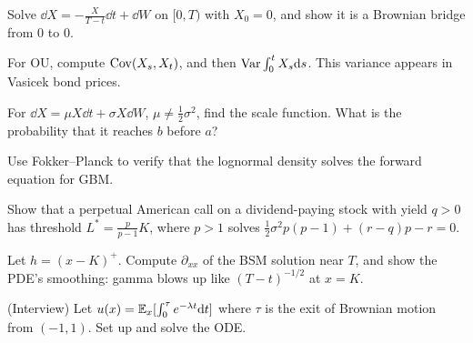 \begin{exercises}
\item Solve $\dd X=-\frac{X}{T-t}\dd t+\dd W$ on $[0,T)$ with $X_0=0$, and show it is a Brownian bridge from $0$ to $0$.
\item For OU, compute $\operatorname{Cov}(X_s,X_t)$, and then $\operatorname{Var}\int_0^tX_s\mathrm{d} s$. This variance appears in Vasicek bond prices.
\item For $\dd X=\mu X\dd t+\sigma X\dd W$, $\mu\ne\tfrac12\sigma^2$, find the scale function. What is the probability that it reaches $b$ before $a$?
\item Use Fokker--Planck to verify that the lognormal density solves the forward equation for GBM.
\item Show that a perpetual American call on a dividend-paying stock with yield $q>0$ has threshold $L^*=\frac{p}{p-1}K$, where $p>1$ solves $\tfrac12\sigma^2p(p-1)+(r-q)p-r=0$.
\item Let $h=(x-K)^+$. Compute $\partial_{xx}$ of the BSM solution near $T$, and show the PDE's smoothing: gamma blows up like $(T-t)^{-1/2}$ at $x=K$.
\item (Interview) Let $u(x)=\mathbb{E}_x[\int_0^\tau e^{-\lambda t}\mathrm{d} t]$ where $\tau$ is the exit of Brownian motion from $(-1,1)$. Set up and solve the ODE.
\end{exercises}
